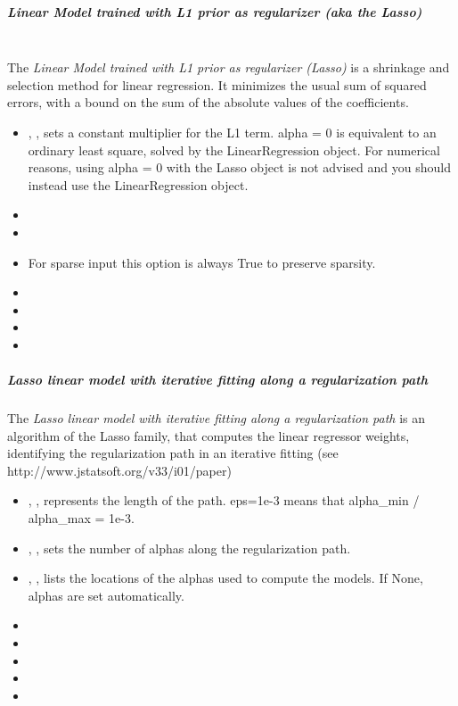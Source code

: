 \subparagraph{Linear Model trained with L1 prior as regularizer (aka the Lasso)}
\mbox{}
\\The \textit{Linear Model trained with L1 prior as regularizer (Lasso)} is a
shrinkage and selection method for linear regression.
%
It minimizes the usual sum of squared errors, with a bound on the sum of the
absolute values of the coefficients.
%
\begin{itemize}
  \item {}, , sets a constant
  multiplier for the L1 term.
  alpha = 0 is equivalent to an ordinary least square, solved by the
  LinearRegression object.
  For numerical reasons, using alpha = 0 with the Lasso object is not advised
  and you should instead use the LinearRegression object.
  \item {}
  \item {}
  \item \precomputeDescription{}
  \nb For sparse input this option is always True to preserve sparsity.
  \item \maxIterDescription{}
  \item {}
  \item \warmStartDescription{}
  \item \positiveDescription{}
\end{itemize}

\subparagraph{Lasso linear model with iterative fitting along a regularization
  path}
\mbox{}

The \textit{Lasso linear model with iterative fitting along a regularization
path} is an algorithm of the Lasso family, that computes the linear regressor weights,
identifying the regularization path in an iterative fitting (see http://www.jstatsoft.org/v33/i01/paper)

\begin{itemize}
  \item {}, , represents the length of
  the path.
  eps=1e-3 means that alpha\_min / alpha\_max = 1e-3.
  \item {}, , sets the number of
  alphas along the regularization path.
  \item {}, , lists the
  locations of the alphas used to compute the models.
  If None, alphas are set automatically.
  \item \precomputeDescription{}
  \item \maxIterDescription{}
  \item {}
  \item \verDescriptionB{}
  \item \positiveDescription{}
\end{itemize}

